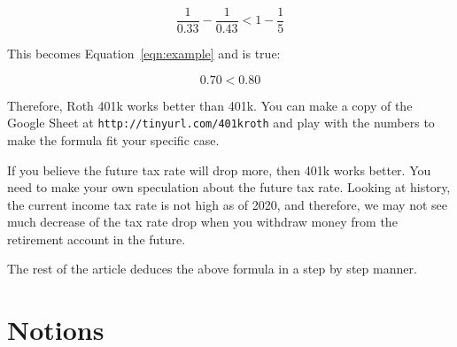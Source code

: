 \documentclass[twocolumn]{article}
\let\url\nolinkurl %
\begin{document}
\begin{equation}
  \frac{1}{0.33} - \frac{1}{0.43} < 1 - \frac{1}{5}
\end{equation}

This becomes Equation~\ref{eqn:example} and is true:

\begin{equation}
  0.70 < 0.80 \label{eqn:example}
\end{equation}

Therefore, Roth 401k works better than 401k. You can make a copy of the Google Sheet at \url{http://tinyurl.com/401kroth} and play with the numbers to make the formula fit your specific case.

If you believe the future tax rate will drop more, then 401k works better. You need to make your own speculation about the future tax rate. Looking at history, the current income tax rate is not high as of 2020, and therefore, we may not see much decrease of the tax rate drop when you withdraw money from the retirement account in the future.

The rest of the article deduces the above formula in a step by step manner.

\section{Notions}
\end{document}
